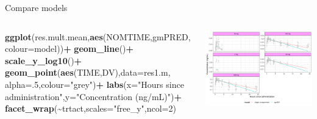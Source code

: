 \documentclass[
  8pt,
  ignorenonframetext,
  aspectratio=169]{beamer}
\newenvironment{Shaded}{\begin{snugshade}}{\end{snugshade}}
\newcommand{\DataTypeTok}[1]{\textcolor[rgb]{0.13,0.29,0.53}{#1}}
\newcommand{\DecValTok}[1]{\textcolor[rgb]{0.00,0.00,0.81}{#1}}
\newcommand{\KeywordTok}[1]{\textcolor[rgb]{0.13,0.29,0.53}{\textbf{#1}}}
\newcommand{\NormalTok}[1]{#1}
\newcommand{\OperatorTok}[1]{\textcolor[rgb]{0.81,0.36,0.00}{\textbf{#1}}}
\newcommand{\StringTok}[1]{\textcolor[rgb]{0.31,0.60,0.02}{#1}}
\begin{document}
\begin{frame}[fragile]{Compare models}
\begin{columns}[T]
\begin{column}{0.45\textwidth}
\begin{Shaded}
\begin{Highlighting}[]
\KeywordTok{ggplot}\NormalTok{(res.mult.mean,}\KeywordTok{aes}\NormalTok{(NOMTIME,gmPRED,}\DataTypeTok{colour=}\NormalTok{model))}\OperatorTok{+}
\StringTok{    }\KeywordTok{geom\_line}\NormalTok{()}\OperatorTok{+}
\StringTok{    }\KeywordTok{scale\_y\_log10}\NormalTok{()}\OperatorTok{+}
\StringTok{    }\KeywordTok{geom\_point}\NormalTok{(}\KeywordTok{aes}\NormalTok{(TIME,DV),}\DataTypeTok{data=}\NormalTok{res1.m,}
               \DataTypeTok{alpha=}\NormalTok{.}\DecValTok{5}\NormalTok{,}\DataTypeTok{colour=}\StringTok{"grey"}\NormalTok{)}\OperatorTok{+}
\StringTok{    }\KeywordTok{labs}\NormalTok{(}\DataTypeTok{x=}\StringTok{"Hours since administration"}\NormalTok{,}\DataTypeTok{y=}\StringTok{"Concentration (ng/mL)"}\NormalTok{)}\OperatorTok{+}
\StringTok{    }\KeywordTok{facet\_wrap}\NormalTok{(}\OperatorTok{\textasciitilde{}}\NormalTok{trtact,}\DataTypeTok{scales=}\StringTok{"free\_y"}\NormalTok{,}\DataTypeTok{ncol=}\DecValTok{2}\NormalTok{)}
\end{Highlighting}
\end{Shaded}
\end{column}

\begin{column}{0.55\textwidth}
\normalsize

\begin{center}\includegraphics[width=1.05\linewidth]{plots/compmodels-1} \end{center}
\end{column}
\end{columns}
\end{frame}
\end{document}
